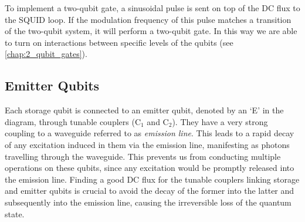 To implement a two-qubit gate, a sinusoidal pulse is sent on top of the DC flux to the SQUID loop. If the modulation frequency of this pulse matches a transition of the two-qubit system, it will perform a two-qubit gate.
In this way we are able to turn on interactions between specific levels of the qubits (see \cref{chap:2_qubit_gates}).

\subsection{Emitter Qubits}
Each storage qubit is connected to an emitter qubit, denoted by an ‘E' in the diagram, through tunable couplers ($\text{C}_1$ and $\text{C}_2$).
They have a very strong coupling to a waveguide referred to as \emph{emission line}.
This leads to a rapid decay of any excitation induced in them via the emission line, manifesting as photons travelling through the waveguide.
This prevents us from conducting multiple operations on these qubits, since any excitation would be promptly released into the emission line.
Finding a good DC flux for the tunable couplers linking storage and emitter qubits is crucial to avoid the decay of the former into the latter and subsequently into the emission line, causing the irreversible loss of the quantum state.
